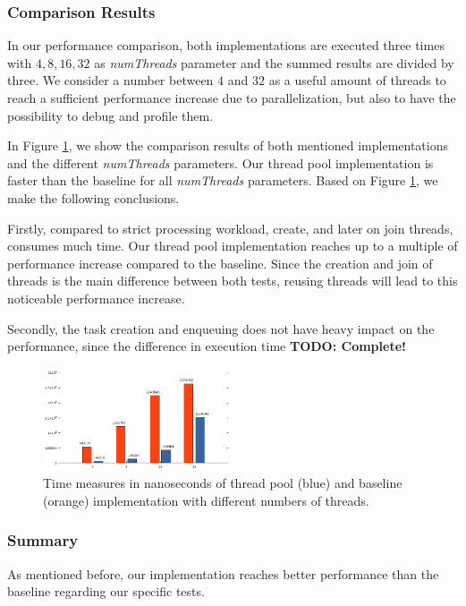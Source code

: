 \documentclass[conference]{IEEEtran}
\begin{document}
\subsubsection{Comparison Results}
In our performance comparison, both implementations are executed three times with $4, 8, 16, 32$ as \emph{numThreads} parameter and the summed results are divided by three. We consider a number between $4$ and $32$ as a useful amount of threads to reach a sufficient performance increase due to parallelization, but also to have the possibility to debug and profile them. 

In Figure \ref{fig6}, we show the comparison results of both mentioned implementations and the different \emph{numThreads} parameters. Our thread pool implementation is faster than the baseline for all \emph{numThreads} parameters. Based on Figure \ref{fig6}, we make the following conclusions. 

Firstly, compared to strict processing workload, create, and later on join threads, consumes much time. Our thread pool implementation reaches up to a multiple of performance increase compared to the baseline. Since the creation and join of threads is the main difference between both tests, reusing threads will lead to this noticeable performance increase. 

Secondly, the task creation and enqueuing does not have heavy impact on the performance, since the difference in execution time \textbf{TODO: Complete!}

\begin{figure}
	\includegraphics[width=0.5\textwidth]{img/pool_baseline.png}
	\caption{Time measures in nanoseconds of thread pool (blue) and baseline (orange) implementation with different numbers of threads.  }
	\label{fig6}
\end{figure}

\subsubsection{Summary}
As mentioned before, our implementation reaches better performance than the baseline regarding our specific tests. 
\end{document}

